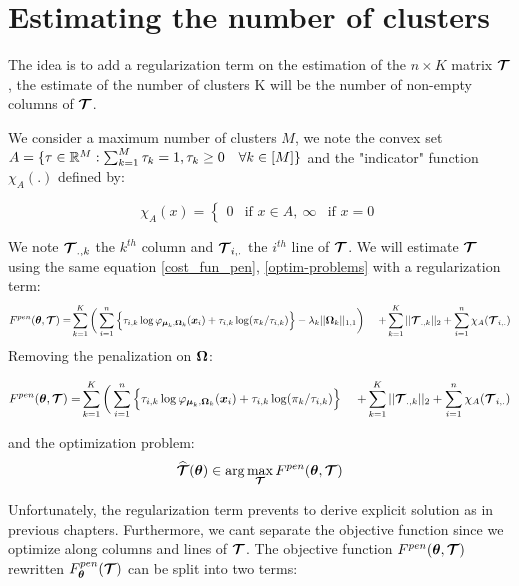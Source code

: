 \section{Estimating the number of clusters}

The idea is to add a regularization term on the estimation of the $n\times K$ matrix $\boldsymbol{\mathcal T}$, the estimate of the number of clusters K will be the number of non-empty columns of $\boldsymbol{\mathcal T}$.\

We consider a maximum number of clusters $M$, we note the convex set $A=\{\tau \in {\mathbb R}^M : \sum_{k=1}^M\tau_k=1, \tau_k\geq 0 \quad \forall k \in [M] \}$ and the "indicator" function $\chi_A(.)$ defined by:


  \begin{equation*}
    \chi_A(x) =
    \begin{cases}
      0 & \text{if } x \in A,\
      	\infty & \text{if } x = 0
    \end{cases}
\end{equation*}

We note $\boldsymbol{\mathcal T}_{.,k}$ the $k^{th}$ column and $\boldsymbol{\mathcal T}_{i,.}$ the $i^{th}$ line of $\boldsymbol{\mathcal T}$. We will estimate $\boldsymbol{\mathcal T}$ using the same equation \ref{cost_fun_pen}, \ref{optim-problems} with a regularization term:\
\begin{align*}
F^{pen}(\btheta,\bTau)  =& \sum_{k=1}^K \bigg(\sum_{i=1}^{n} \Big\{\tau_{i,k}\log\varphi_{\bmu_{k},\bOmega_{k}}(\bx_i)+\tau_{i,k}
    \log(\pi_k/\tau_{i,k})\Big\}-\lambda_k||\bOmega_k||_{1,1}\bigg)\ 
    &+ \sum_{k=1}^K ||\bTau_{.,k}||_{2} + \sum_{i=1}^{n} \chi_A(\bTau_{i,.})
\end{align*}
Removing the penalization on $\boldsymbol\Omega$:

\begin{align*}
F^{pen}(\btheta,\bTau)  =& \sum_{k=1}^K \bigg(\sum_{i=1}^{n} \Big\{\tau_{i,k}\log\varphi_{\bmu_{k},\bOmega_{k}}(\bx_i)+\tau_{i,k}
    \log(\pi_k/\tau_{i,k})\Big\}\ 
    &+ \sum_{k=1}^K ||\bTau_{.,k}||_{2} + \sum_{i=1}^{n} \chi_A(\bTau_{i,.})
\end{align*}

 and the optimization problem:
\begin{equation}
\widehat{\boldsymbol{\mathcal T}}({\boldsymbol\theta})\in \arg\max_{\boldsymbol{\mathcal T}} F^{pen}({\boldsymbol\theta},\boldsymbol{\mathcal T})
\end{equation}

Unfortunately, the regularization term prevents to derive explicit solution as in previous chapters. Furthermore, we cant separate the objective function since we optimize along columns and lines of $\boldsymbol{\mathcal T}$. The objective function $F^{pen}({\boldsymbol\theta},\boldsymbol{\mathcal T})$ rewritten
$F^{pen}_{{\boldsymbol\theta}}(\boldsymbol{\mathcal T})$ can be split into two terms:

